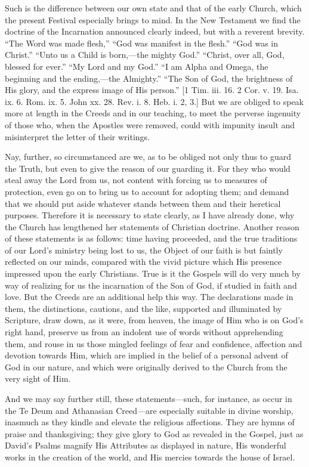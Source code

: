 Such is the difference between our own state and that of the early
Church, which the present Festival especially brings to mind. In the
New Testament we find the doctrine of the Incarnation announced
clearly indeed, but with a reverent brevity. ``The Word was made
flesh,'' ``God was manifest in the flesh.'' ``God was
in Christ.'' ``Unto us a Child is born,—the mighty
God.'' ``Christ, over all, God, blessed for ever.''
``My Lord and my God.'' ``I am Alpha and Omega, the
beginning and the ending,—the Almighty.'' ``The Son of God,
the brightness of His glory, and the express image of His person.''
[1 Tim. iii. 16. 2 Cor. v. 19. Isa. ix. 6. Rom. ix. 5. John xx. 28.
Rev. i. 8. Heb. i. 2, 3.] But we are obliged to speak more at length
in the Creeds and in our teaching, to meet the perverse ingenuity of
those who, when the Apostles were removed, could with impunity insult
and misinterpret the letter of their writings.

Nay, further, so circumstanced are we, as to be obliged not only
thus to guard the Truth, but even to give the reason of our guarding
it. For they who would steal away the Lord from us, not content with
forcing us to measures of protection, even go on to bring us to
account for adopting them; and demand that we should put aside
whatever stands between them and their heretical purposes. Therefore
it is necessary to state clearly, as I have already done, why the
Church has lengthened her statements of Christian doctrine. Another
reason of these statements is as follows: time having proceeded, and
the true traditions of our Lord's ministry being lost to us, the
Object of our faith is but faintly reflected on our minds, compared
with the vivid picture which His presence impressed upon the early
Christians. True is it the Gospels will do very much by way of
realizing for us the incarnation of the Son of God, if studied in
faith and love. But the Creeds are an additional help this way. The
declarations made in them, the distinctions, cautions, and the like,
supported and illuminated by Scripture, draw down, as it were, from
heaven, the image of Him who is on God's right hand, preserve us from
an indolent use of words without apprehending them, and rouse in us
those mingled feelings of fear and confidence, affection and devotion
towards Him, which are implied in the belief of a personal advent of
God in our nature, and which were originally derived to the Church
from the very sight of Him.

And we may say further still, these statements—such, for
instance, as occur in the Te Deum and Athanasian Creed—are
especially suitable in divine worship, inasmuch as they kindle and
elevate the religious affections. They are hymns of praise and
thanksgiving; they give glory to God as revealed in the Gospel, just
as David's Psalms magnify His Attributes as displayed in nature, His
wonderful works in the creation of the world, and His mercies towards
the house of Israel.


